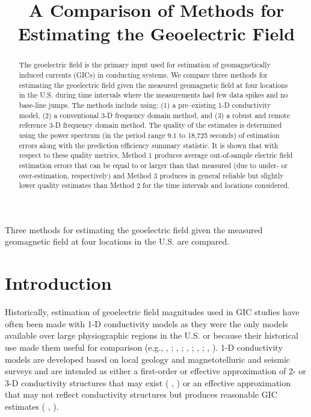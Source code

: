 \documentclass[linenumbers,draft]{agujournal}
\newcommand{\citeay}[1]{%
\citeauthor{#1}, \citeyear{#1}%
}
\begin{document}
\title{A Comparison of Methods for Estimating the Geoelectric Field}




\begin{keypoints}
\item Three methods for estimating the geoelectric field given the measured geomagnetic field at four locations in the U.S. are compared.
\end{keypoints}

%
%

\begin{abstract}
The geoelectric field is the primary input used for estimation of geomagnetically induced currents (GICs) in conducting systems.  We compare three methods for estimating the geoelectric field given the measured geomagnetic field at four locations in the U.S. during time intervals where the measurements had few data spikes and no base-line jumps.  The methods include using: (1) a pre--existing 1-D conductivity model, (2) a conventional 3-D frequency domain method, and (3) a robust and remote reference 3-D frequency domain method.  The quality of the estimates is determined using the power spectrum (in the period range 9.1 to 18,725 seconds) of estimation errors along with the prediction efficiency summary statistic. It is shown that with respect to these quality metrics, Method 1 produces average out-of-sample electric field estimation errors that can be equal to or larger than that measured (due to under- or over-estimation, respectively) and Method 3 produces in general reliable but slightly lower quality estimates than Method 2 for the time intervals and locations considered. 
\end{abstract}

\section{Introduction}

Historically, estimation of geoelectric field magnitudes used in GIC studies have often been made with 1-D conductivity models as they were the only models available over large physiographic regions in the U.S. or because their historical use made them useful for comparison (e.g., \citeay{Pulkkinen2012}; \citeay{Wei2013}; \citeay{Viljanen2014}; \citeay{Boteler2015}; \citeay{NERC2015}).  1-D conductivity models are developed based on local geology and magnetotelluric and seismic surveys and are intended as either a first-order or effective approximation of 2- or 3-D conductivity structures that may exist (\citeay{Fernberg2012}) or an effective approximation that may not reflect conductivity structures but produces reasonable GIC estimates (\citeay{Boteler2015}). 
\end{document}
